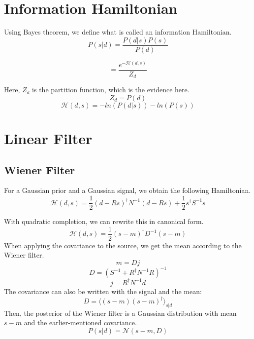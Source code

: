 \section{Information Hamiltonian}

Using Bayes theorem, we define what is called an information Hamiltonian.
\begin{equation}
    P(s|d) = \frac{P(d|s)P(s)}{P(d)}
\end{equation}
    
\begin{equation}
    = \frac{e^{-\mathcal{H}(d, s)}}{Z_d}
\end{equation}

Here, $Z_d$ is the partition function, which is the evidence here.
\begin{equation}
    Z_d = P(d)
\end{equation}
\begin{equation}
        \mathcal{H}(d, s) = -ln(P(d|s)) - ln(P(s))
\end{equation}

\section{Linear Filter}
\subsection{Wiener Filter}
For a Gaussian prior and a Gaussian signal, we obtain the following
Hamiltonian.
\begin{equation}
    \mathcal{H}(d, s) = \frac{1}{2}(d-Rs)^{\dagger}N^{-1}(d-Rs)+\frac{1}{2}s^{\dagger}S^{-1}s
\end{equation}

With quadratic completion, we can rewrite this in canonical form.
\begin{equation}
    \mathcal{H}(d, s) = \frac{1}{2}(s-m)^\dagger D^{-1}(s-m)
\end{equation}
When applying the covariance to the source, we get the mean according to the Wiener filter.
\begin{equation}
    m = Dj
\end{equation}
\begin{equation}
    D =(S^{-1}+R^{\dagger}N^{-1}R)^{-1}
\end{equation}
\begin{equation}
    j =R^{\dagger}N^{-1}d
\end{equation}
The covariance can also be written with the signal and the mean:
\begin{equation}
    D=\langle (s-m)(s-m)^\dagger \rangle_{s|d}
\end{equation}
Then, the posterior of the Wiener filter is a Gaussian distribution with mean $s-m$ and the earlier-mentioned covariance.
\begin{equation}
    P(s|d)=\mathcal{N}(s-m, D)
\end{equation}

